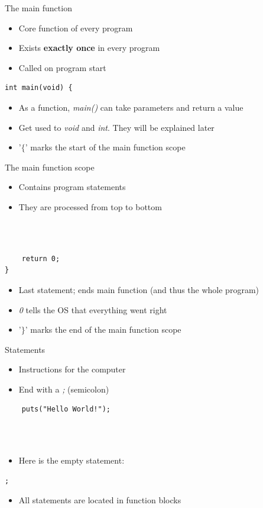 \documentclass[10pt,graphics,aspectratio=169,table]{beamer}
\begin{document}
\begin{frame}[fragile]{The main function}
	\begin{itemize}
		\item Core function of every program
		\item Exists \textbf{exactly once} in every program
		\item Called on program start
	\end{itemize}
	\begin{lstlisting}
int main(void) {
\end{lstlisting}
	\begin{itemize}
		\item As a function, \textit{main()} can take parameters and return a value
		\item Get used to \textit{void} and \textit{int}. They will be explained later
		\item '$\lbrace$' marks the start of the main function scope
	\end{itemize}
\end{frame}
\begin{frame}[fragile]{The main function scope}
	\begin{itemize}
		\item Contains program statements
		\item They are processed from top to bottom
	\end{itemize} \ \\
	\ \\
	\begin{lstlisting}
	return 0;
}
\end{lstlisting}
	\begin{itemize}
		\item Last statement; ends main function (and thus the whole program)
		\item \textit{0} tells the OS that everything went right
		\item '$\rbrace$' marks the end of the main function scope
	\end{itemize}
\end{frame}
\begin{frame}[fragile]{Statements}
	\begin{itemize}
		\item Instructions for the computer
		\item End with a \textit{;} (semicolon)
	\end{itemize}
	\begin{lstlisting}
	puts("Hello World!");
\end{lstlisting} \ \\ \ \\
	\begin{itemize}
		\item Here is the empty statement:
	\end{itemize}
	\begin{lstlisting}[numbers=none]
	;
\end{lstlisting}
	\begin{itemize}
		\item All statements are located in function blocks
	\end{itemize}
\end{frame}
\end{document}
